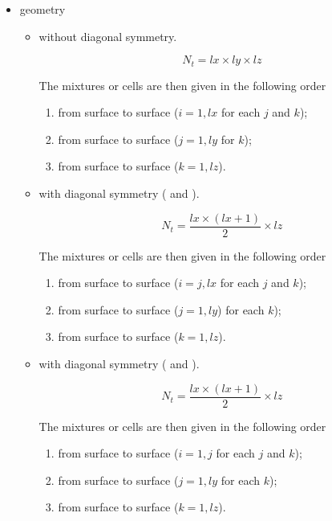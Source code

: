 \begin{itemize}
\item {} geometry 
\begin{itemize}
\item without diagonal symmetry. 

$$N_{t}=\textit{lx}\times \textit{ly}\times \textit{lz}$$

The mixtures or cells are then given in the following order
\begin{enumerate}
\item from surface  to surface  ($i=1,\textit{lx}$ for each $j$ and $k$);
\item from surface  to surface  ($j=1,\textit{ly}$ for $k$);
\item from surface  to surface  ($k=1,\textit{lz}$).
\end{enumerate}

\item with diagonal symmetry ( and ). 

$$N_{t}=\frac{\textit{lx}\times (\textit{lx}+1)}{2}\times\textit{lz}$$

The mixtures or cells are then given in the following order
\begin{enumerate}
\item from surface  to surface  ($i=j,\textit{lx}$ for each $j$ and $k$);
\item from surface  to surface  ($j=1,\textit{ly}$) for each $k$);
\item from surface  to surface  ($k=1,\textit{lz}$).
\end{enumerate}
 

\item with diagonal symmetry ( and ). 

$$N_{t}=\frac{\textit{lx}\times (\textit{lx}+1)}{2}\times\textit{lz}$$

The mixtures or cells are then given in the following order
\begin{enumerate}
\item from surface  to surface  ($i=1,j$ for each $j$ and $k$);
\item from surface  to surface  ($j=1,\textit{ly}$ for each $k$);
\item from surface  to surface  ($k=1,\textit{lz}$).
\end{enumerate}

\end{itemize}


\end{itemize}
